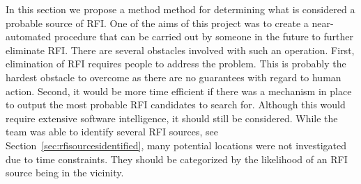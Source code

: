 \documentclass[a4paper,12pt]{article}
\begin{document}
                                                                                                                                                                                                                                                                                                                                                                                                                                                                                                                                                                                                                                                                                                                                                                                                                                                                                                                                                                                                                                                                                                                                                                                                                                                                                                                                                                                                                                                                                                                                                            
In this section we propose a method method for determining what is considered a probable source of RFI. One of the aims of this project was to create a near-automated procedure that can be carried out by someone in the future to further eliminate RFI.  There are several obstacles involved with such an operation. First, elimination of RFI requires people to address the problem. This is probably the hardest obstacle to overcome as there are no guarantees with regard to human action. Second, it would be more time efficient if there was a mechanism in place to output the most probable RFI candidates to search for. Although this would require extensive software intelligence, it should still be considered. While the team was able to identify several RFI sources, see Section~\ref{sec:rfisourcesidentified}, many potential locations were not investigated due to time constraints. They should be categorized by the likelihood of an RFI source being in the vicinity. 
\end{document}

